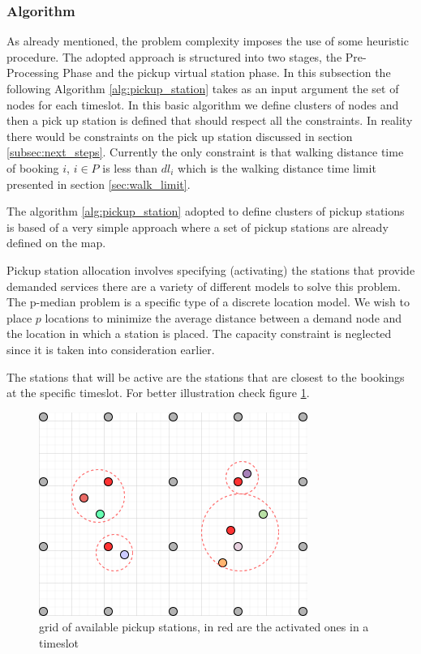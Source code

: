 \documentclass{article}
\begin{document}
\subsubsection{Algorithm}
\label{subsec:alg}
As already mentioned, the problem complexity imposes the use of some heuristic procedure. The adopted approach is structured into two stages, the Pre-Processing Phase
and the pickup virtual station phase. In this subsection the following Algorithm \ref{alg:pickup_station} takes as an input argument the set of nodes for each timeslot. %
In this basic algorithm we define clusters of nodes and then a pick up station is defined that should respect all the constraints. In reality there would be constraints on the pick up station discussed in section \ref{subsec:next_steps}. Currently the only constraint 
is that walking distance time of booking $i$, $i \in P$  is less than $dl_i$ which is the walking distance time limit presented in section \ref{sec:walk_limit}.

The algorithm \ref{alg:pickup_station} adopted to define clusters of pickup stations is based of a very simple approach where a set of pickup stations are already defined on the map. 

Pickup station allocation involves specifying (activating) the stations that provide demanded services there are a variety of different models to solve
this problem.
The p-median problem is a specific type of a discrete location model. We wish to place $p$ locations to minimize the average distance between a demand
node and the location in which a station is placed. The capacity constraint is neglected since it is taken into consideration earlier.

The stations that will be active are the stations that are closest to the bookings at the specific timeslot. For better illustration check figure \ref{fig:pickup_stations}.

\begin{figure}[H]
    \centering 
  \includegraphics[width=0.5\linewidth]{pictures/pickup_stations}
  \caption{grid of available pickup stations, in red are the activated ones in a timeslot}
\label{fig:pickup_stations}
\end{figure}
\end{document}
